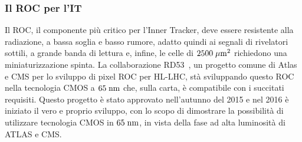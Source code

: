 
\subsubsection{Il ROC per l'IT}
\label{IntroROCIT}

Il ROC, il componente pi\`u critico per l'Inner Tracker, deve essere resistente alla radiazione, a bassa soglia e basso rumore, adatto quindi ai segnali di rivelatori sottili, a grande banda di lettura e, infine, le celle di $2500 \; \mu \rm m^2$ richiedono una miniaturizzazione spinta. La collaborazione RD53~\cite{RD53}, un progetto comune di Atlas e CMS per lo sviluppo di pixel ROC per HL-LHC, st\`a sviluppando questo ROC nella tecnologia CMOS a $65\rm \; nm$ che, sulla carta, \`e compatibile con i succitati requisiti. Questo progetto è stato approvato nell'autunno del 2015 e nel 2016 è iniziato il vero e proprio sviluppo, con lo scopo di dimostrare la possibilità di utilizzare tecnologia CMOS in $65\rm \; nm$, in vista della fase ad alta luminosità di ATLAS e CMS. 


